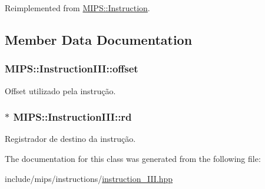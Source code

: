 Reimplemented from \hyperlink{classMIPS_1_1Instruction_a7df847adef2997446ffca9b71c2f3112}{M\+I\+P\+S\+::\+Instruction}.



\subsection{Member Data Documentation}
\subsubsection[{\texorpdfstring{offset}{offset}}]{ M\+I\+P\+S\+::\+Instruction\+I\+I\+I\+::offset\hspace{0.3cm}{\ttfamily [protected]}}\hypertarget{classMIPS_1_1InstructionIII_ad0ebd3b6e7594fc583e9a409bf99a6c7}{}\label{classMIPS_1_1InstructionIII_ad0ebd3b6e7594fc583e9a409bf99a6c7}
Offset utilizado pela instrução. 
\subsubsection[{\texorpdfstring{rd}{rd}}]{$\ast$ M\+I\+P\+S\+::\+Instruction\+I\+I\+I\+::rd\hspace{0.3cm}{\ttfamily [protected]}}\hypertarget{classMIPS_1_1InstructionIII_a76e7b218fc57cd2fc559bf72498090b6}{}\label{classMIPS_1_1InstructionIII_a76e7b218fc57cd2fc559bf72498090b6}
Registrador de destino da instrução. 

The documentation for this class was generated from the following file\+:\begin{DoxyCompactItemize}
\item 
include/mips/instructions/\hyperlink{instruction__III_8hpp}{instruction\+\_\+\+I\+I\+I.\+hpp}\end{DoxyCompactItemize}
